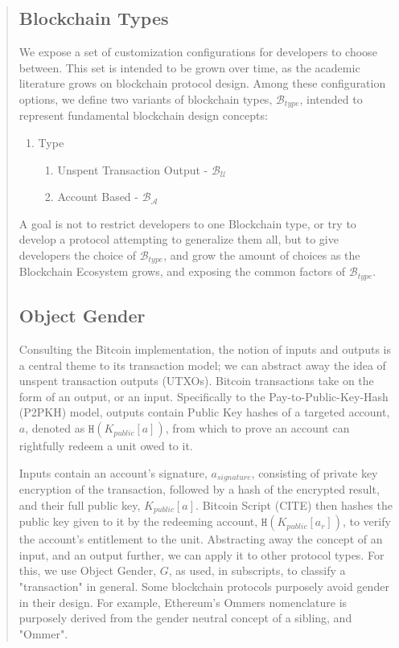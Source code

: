 \documentclass[12pt, titlepage, twocolumn]{report}
\begin{document}
\begin{quotation}
\subsection{Blockchain Types}
We expose a set of customization configurations for developers to choose between. This set is intended to be grown over time, as the academic literature grows on blockchain protocol design. Among these configuration options, we define two variants of blockchain types, \(\boldsymbol{\mathcal{B}}_{type}\), intended to represent fundamental blockchain design concepts:

\begin{enumerate}
 \item Type
	\begin{enumerate}
 		\item Unspent Transaction Output - \(\boldsymbol{\mathcal{B}}_{\mathcal{U}}\)
		\item Account Based - \(\boldsymbol{\mathcal{B}}_{\mathcal{A}}\)
	\end{enumerate}
\end{enumerate}

A goal is not to restrict developers to one Blockchain type, or try to develop a protocol attempting to generalize them all, but to give developers the choice of \(\boldsymbol{\mathcal{B}}_{type}\), and grow the amount of choices as the Blockchain Ecosystem grows, and exposing the common factors of \(\boldsymbol{\mathcal{B}}_{type}\).

\subsection{Object Gender}
Consulting the Bitcoin implementation, the notion of inputs and outputs is a central theme to its transaction model; we can abstract away the idea of unspent transaction outputs (UTXOs). Bitcoin transactions take on the form of an output, or an input. Specifically to the Pay-to-Public-Key-Hash (P2PKH) model, outputs contain Public Key hashes of a targeted account, \(a\), denoted as \(\boldsymbol{\texttt{H}}(K_{public}[a])\), from which to prove an account can rightfully redeem a unit owed to it. 

Inputs contain an account's signature, \(a_{signature}\), consisting of private key encryption of the transaction, followed by a hash of the encrypted result, and their full public key, \(K_{public}[a]\). Bitcoin Script (CITE) then hashes the public key given to it by the redeeming account, \(\boldsymbol{\texttt{H}}(K_{public}[a_r])\), to verify the account's entitlement to the unit. Abstracting away the concept of an input, and an output further, we can apply it to other protocol types. For this, we use Object Gender, \(G\), as used, in subscripts, to classify a "transaction" in general. Some blockchain protocols purposely avoid gender in their design. For example, Ethereum's Ommers nomenclature is purposely derived from the gender neutral concept of a sibling, and "Ommer".


\end{quotation}
\end{document}

